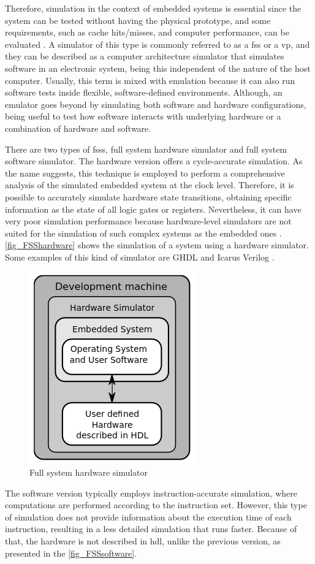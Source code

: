 Therefore, simulation in the context of embedded systems is essential since the system can be tested without having the physical prototype, and 
some requirements, such as cache hits/misses, and computer performance, can be evaluated \cite{pargem5}. A simulator of this type is commonly 
referred to as a \acrfull{fss} or a \acrfull{vp}, and they can be described as a computer architecture simulator that simulates software in an 
electronic system, being this independent of the nature of the host computer. Usually, this term is mixed with emulation because it can also 
run software tests inside flexible, software-defined environments. Although, an emulator goes beyond by simulating both software and hardware 
configurations, being useful to test how software interacts with underlying hardware or a combination of hardware and software.

There are two types of \glspl{fss}, full system hardware simulator and full system software simulator. The hardware version offers a 
cycle-accurate simulation. As the name suggests, this technique is employed to perform a comprehensive analysis of the simulated embedded system 
at the clock level. Therefore, it is possible to accurately simulate hardware state transitions, obtaining specific information as the state of 
all logic gates or registers. Nevertheless, it can have very poor simulation performance because hardware-level simulators are not suited for 
the simulation of such complex systems as the embedded ones \cite{TypesOfFSS}. \autoref{fig_FSShardware} shows the simulation of a system using 
a hardware simulator. Some examples of this kind of simulator are GHDL \cite{GHDLMainHomePage} and Icarus Verilog \cite{williams2002icarus}.

\begin{figure}[H]
	\centering
 	\includegraphics[width=0.3\linewidth]{Images/FSShardware.png}
 	\caption{Full system hardware simulator \cite{TypesOfFSS}}
	 \label{fig_FSShardware}
\end{figure}

The software version typically employs instruction-accurate simulation, where computations are performed according to the instruction set. 
However, this type of simulation does not provide information about the execution time of each instruction, resulting in a less detailed simulation 
that runs faster. Because of that, the hardware is not described in \gls{hdl}, unlike the previous version, as presented in the 
\autoref{fig_FSSsoftware}.

